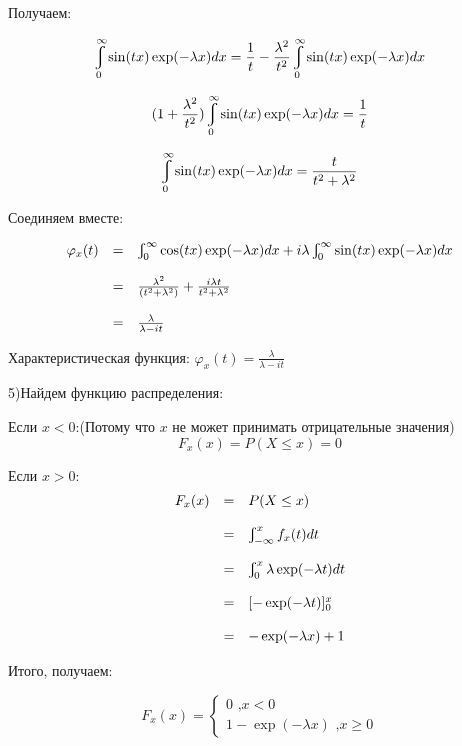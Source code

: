 \documentclass[a4paper,12pt, oneside]{article}
\let\int\varint
\begin{document}
	Получаем:
	
	$$
	\int_0^\infty \sin(tx)\exp(-\lambda x)dx = \frac{1}{t} - \frac{\lambda ^2}{t^2} \int_{0}^{\infty} \sin(tx) \exp(-\lambda x)dx
	$$
	
	$$
	(1 + \frac{\lambda^2}{t^2}) \int_0^\infty \sin(tx)\exp(-\lambda x)dx = \frac{1}{t}
	$$
	
	$$
	\int_0^\infty \sin(tx)\exp(-\lambda x)dx = \frac{t}{t^2 + \lambda^2}
	$$

	Соединяем вместе:
	
	$$
	\begin{array}{rcl}
	\varphi_x(t) &=& \int_0^\infty \cos(tx)\exp(-\lambda x)dx +  i \lambda \int_0^\infty \sin(tx)\exp(-\lambda x)dx\\
	\\
	&=&\frac{\lambda^2}{(t^2 + \lambda^2)} + \frac{i\lambda t}{t^2 + \lambda^2}\\
	\\
	&=&\frac{\lambda}{\lambda - i t}
	\end{array}	
	$$
	
	\vspace{\baselineskip}
	Характеристическая функция: $\varphi_x(t) = \frac{\lambda}{\lambda - i t}$
	

	\vspace{\baselineskip}
	5)Найдем функцию распределения:
	
	Если $x < 0$:(Потому что $x$ не может принимать отрицательные значения)
	$$
	F_x(x) = P(X \le x) = 0
	$$
	
	Если $x > 0$:
	$$
	\begin{array}{rcl}
	F_x(x) &=& P(X \le x)\\
	\\
	&=& \int_{-\infty}^{x}f_x(t)dt\\
	\\
	&=& \int_{0}^{x} \lambda\exp(-\lambda t)dt\\
	\\
	&=&[-\exp(-\lambda t)]_0^x\\
	\\
	&=&-\exp(-\lambda x) + 1
	\end{array}	
	$$
	
	Итого, получаем:
	

	\begin{equation*}
	F_x(x) = 
		\begin{cases}
			0 \text{	,$x < 0$}\\
			1 - \exp(-\lambda x) \text{		,$x \ge 0$}
		\end{cases}
	\end{equation*}
	
\end{document}
